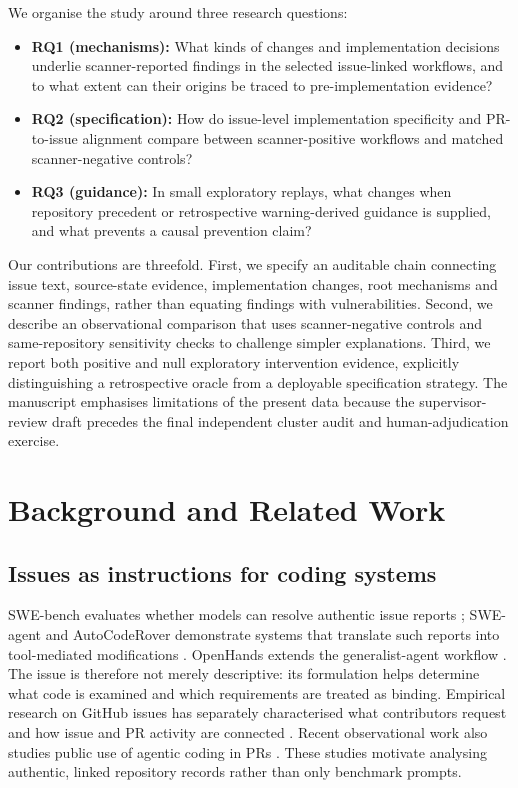 \documentclass[journal,10pt,twoside]{IEEEtran}
\begin{document}
We organise the study around three research questions:
\begin{itemize}
\item \textbf{RQ1 (mechanisms):} What kinds of changes and implementation decisions underlie scanner-reported findings in the selected issue-linked workflows, and to what extent can their origins be traced to pre-implementation evidence?
\item \textbf{RQ2 (specification):} How do issue-level implementation specificity and PR-to-issue alignment compare between scanner-positive workflows and matched scanner-negative controls?
\item \textbf{RQ3 (guidance):} In small exploratory replays, what changes when repository precedent or retrospective warning-derived guidance is supplied, and what prevents a causal prevention claim?
\end{itemize}

Our contributions are threefold. First, we specify an auditable chain connecting issue text, source-state evidence, implementation changes, root mechanisms and scanner findings, rather than equating findings with vulnerabilities. Second, we describe an observational comparison that uses scanner-negative controls and same-repository sensitivity checks to challenge simpler explanations. Third, we report both positive and null exploratory intervention evidence, explicitly distinguishing a retrospective oracle from a deployable specification strategy. The manuscript emphasises limitations of the present data because the supervisor-review draft precedes the final independent cluster audit and human-adjudication exercise.

\section{Background and Related Work}
\subsection{Issues as instructions for coding systems}
SWE-bench evaluates whether models can resolve authentic issue reports \citep{jimenez2024swebench}; SWE-agent and AutoCodeRover demonstrate systems that translate such reports into tool-mediated modifications \citep{yang2024sweagent,zhang2024autocoderover}. OpenHands extends the generalist-agent workflow \citep{wang2025openhands}. The issue is therefore not merely descriptive: its formulation helps determine what code is examined and which requirements are treated as binding. Empirical research on GitHub issues has separately characterised what contributors request and how issue and PR activity are connected \citep{yang2023githubissues,souza2024topologies,tan2020goodfirst}. Recent observational work also studies public use of agentic coding in PRs \citep{watanabe2026agentic}. These studies motivate analysing authentic, linked repository records rather than only benchmark prompts.
\end{document}
